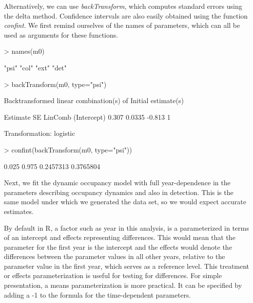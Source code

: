 \documentclass[12pt]{article}
\renewenvironment{Schunk}{\vspace{\topsep}}{\vspace{\topsep}}
\begin{document}
Alternatively, we can use \emph{backTransform}, which
computes standard errors using the delta method. Confidence intervals
are also easily obtained using the function \emph{confint}.
We first remind ourselves of the names of parameters, which can all be
used as arguments for these functions.


\begin{small}

\begin{Schunk}
\begin{Sinput}
> names(m0)
\end{Sinput}
\begin{Soutput}
[1] "psi" "col" "ext" "det"
\end{Soutput}
\begin{Sinput}
> backTransform(m0, type="psi")
\end{Sinput}
\begin{Soutput}
Backtransformed linear combination(s) of Initial estimate(s)

 Estimate     SE LinComb (Intercept)
    0.307 0.0335  -0.813           1

Transformation: logistic 
\end{Soutput}
\begin{Sinput}
> confint(backTransform(m0, type="psi"))
\end{Sinput}
\begin{Soutput}
     0.025     0.975
 0.2457313 0.3765804
\end{Soutput}
\end{Schunk}
\end{small}


Next, we fit the dynamic occupancy model with full year-dependence in
the parameters describing occupancy dynamics and also in detection.
This is the same model under which we generated the data set, so we
would expect accurate estimates.

By default in R, a factor such as year in this analysis, is a
parameterized in terms of an intercept and effects representing
differences. This would mean that the parameter for the first year is
the intercept  and the effects would denote the differences between
the parameter  values in all other years, relative to the parameter
value in the first year, which serves as a reference level.
This treatment or effects parameterization is useful for testing for
differences. For simple presentation, a means parameterization is more
practical. It can be specified by adding a -1 to the formula for the
time-dependent parameters.
\end{document}
